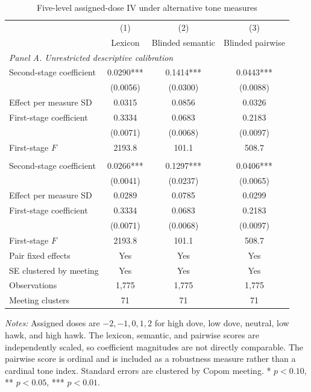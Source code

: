 \begin{table}[htbp]
\color{revisionred}
\centering
\begin{threeparttable}
\caption{Five-level assigned-dose IV under alternative tone measures}
\label{tab:dose-tone-iv}
\begin{scriptsize}
\begin{tabular}{lccc}
\toprule
 & (1) & (2) & (3) \\
 & Lexicon & Blinded semantic & Blinded pairwise \\
\midrule
\multicolumn{4}{l}{\textit{Panel A. Unrestricted descriptive calibration}} \\
Second-stage coefficient & 0.0290*** & 0.1414*** & 0.0443*** \\
 & (0.0056) & (0.0300) & (0.0088) \\
Effect per measure SD & 0.0315 & 0.0856 & 0.0326 \\
\addlinespace
First-stage coefficient & 0.3334 & 0.0683 & 0.2183 \\
 & (0.0071) & (0.0068) & (0.0097) \\
First-stage $F$ & 2193.8 & 101.1 & 508.7 \\ 
\addlinespace
\multicolumn{4}{l}{\textit{Panel B. Hierarchical simplex calibration}} \\
Second-stage coefficient & 0.0266*** & 0.1297*** & 0.0406*** \\
 & (0.0041) & (0.0237) & (0.0065) \\
Effect per measure SD & 0.0289 & 0.0785 & 0.0299 \\
\addlinespace
First-stage coefficient & 0.3334 & 0.0683 & 0.2183 \\
 & (0.0071) & (0.0068) & (0.0097) \\
First-stage $F$ & 2193.8 & 101.1 & 508.7 \\ 
\midrule
Pair fixed effects & Yes & Yes & Yes \\
SE clustered by meeting & Yes & Yes & Yes \\
Observations & 1,775 & 1,775 & 1,775 \\
Meeting clusters & 71 & 71 & 71 \\
\bottomrule
\end{tabular}
\begin{tablenotes}[flushleft]
\scriptsize
\item \textit{Notes:} Assigned doses are $-2,-1,0,1,2$ for high dove, low dove, neutral, low hawk, and high hawk. The lexicon, semantic, and pairwise scores are independently scaled, so coefficient magnitudes are not directly comparable. The pairwise score is ordinal and is included as a robustness measure rather than a cardinal tone index. Standard errors are clustered by Copom meeting. * $p<0.10$, ** $p<0.05$, *** $p<0.01$.
\end{tablenotes}
\end{scriptsize}
\end{threeparttable}
\end{table}
